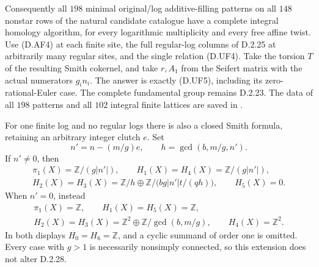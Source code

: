 Consequently all $198$ minimal original/log additive-filling
patterns on all $148$ nonstar rows of the natural candidate
catalogue have a complete integral homology algorithm, for
every logarithmic multiplicity and every free affine twist.
Use (D.AF4) at each finite site, the full regular-log columns
of D.2.25 at arbitrarily many regular sites, and the single
relation (D.UF4). Take the torsion $T$ of the resulting Smith
cokernel, and take $r,A_1$ from the Seifert matrix with the
actual numerators $g_i n_i$. The answer is exactly (D.UF5),
including its zero-rational-Euler case. The complete
fundamental group remains D.2.23. The data of all $198$
patterns and all $102$ integral finite lattices are saved in
.

For one finite log and no regular logs there is also a closed
Smith formula, retaining an arbitrary integer clutch $e$.
Set
\[
 n'=n-(m/g)e,
 \qquad h=\gcd(b,m/g,n').                                  \tag{D.AF5}
\]
If $n'\ne0$, then
\[
\begin{gathered}
 \pi_1(X)=\mathbb Z/(g|n'|),\qquad
 H_1(X)=H_4(X)=\mathbb Z/(g|n'|),\\
 H_2(X)=H_3(X)=
 \mathbb Z/h\oplus\mathbb Z/\bigl(bg|n'|t/(qh)\bigr),
 \qquad H_5(X)=0.
\end{gathered}                                               \tag{D.AF6}
\]
When $n'=0$, instead
\[
\begin{gathered}
 \pi_1(X)=\mathbb Z,\qquad H_1(X)=H_5(X)=\mathbb Z,\\
 H_2(X)=H_3(X)=\mathbb Z^2\oplus
                         \mathbb Z/\gcd(b,m/g),\qquad
 H_4(X)=\mathbb Z^2.
\end{gathered}                                               \tag{D.AF7}
\]
In both displays $H_0=H_6=\mathbb Z$, and a cyclic summand of
order one is omitted. Every case with $g>1$ is necessarily
nonsimply connected, so this extension does not alter D.2.28.

